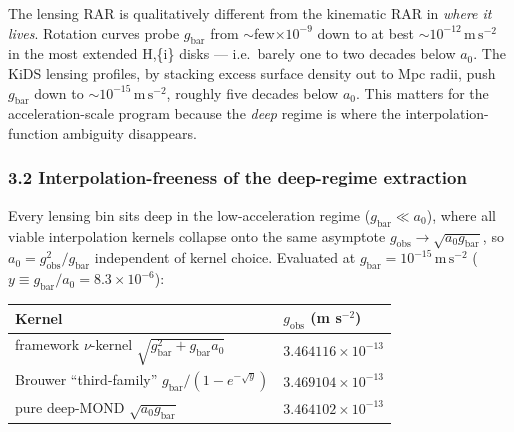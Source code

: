 \documentclass[
]{article}
\newcounter{none} %
\begin{document}
The lensing RAR is qualitatively different from the kinematic RAR in
\emph{where it lives}. Rotation curves probe \(g_\mathrm{bar}\) from
\(\sim\)few\(\times10^{-9}\) down to at best
\(\sim10^{-12}\,\mathrm{m\,s^{-2}}\) in the most extended H,\{\sc i\}
disks --- i.e.~barely one to two decades below \(a_0\). The KiDS lensing
profiles, by stacking excess surface density out to Mpc radii, push
\(g_\mathrm{bar}\) down to \(\sim10^{-15}\,\mathrm{m\,s^{-2}}\), roughly
five decades below \(a_0\). This matters for the acceleration-scale
program because the \emph{deep} regime is where the
interpolation-function ambiguity disappears.

\subsubsection{3.2 Interpolation-freeness of the deep-regime
extraction}\label{interpolation-freeness-of-the-deep-regime-extraction}

Every lensing bin sits deep in the low-acceleration regime
(\(g_\mathrm{bar}\ll a_0\)), where all viable interpolation kernels
collapse onto the same asymptote
\(g_\mathrm{obs}\to\sqrt{a_0 g_\mathrm{bar}}\), so
\(a_0 = g_\mathrm{obs}^2/g_\mathrm{bar}\) independent of kernel choice.
Evaluated at \(g_\mathrm{bar}=10^{-15}\,\mathrm{m\,s^{-2}}\)
(\(y\equiv g_\mathrm{bar}/a_0 = 8.3\times10^{-6}\)):

{\def\LTcaptype{none} %
\begin{longtable}[]{@{}
  >{\raggedright\arraybackslash}p{}
  >{\raggedright\arraybackslash}p{}@{}}
\toprule\noalign{}
\begin{minipage}[b]{\linewidth}\raggedright
Kernel
\end{minipage} & \begin{minipage}[b]{\linewidth}\raggedright
\(g_\mathrm{obs}\) (m s\(^{-2}\))
\end{minipage} \\
\midrule\noalign{}
\endhead
\bottomrule\noalign{}
\endlastfoot
framework \(\nu\)-kernel \(\sqrt{g_\mathrm{bar}^2+g_\mathrm{bar}a_0}\) &
\(3.464116\times10^{-13}\) \\
Brouwer ``third-family'' \(g_\mathrm{bar}/(1-e^{-\sqrt{y}})\) &
\(3.469104\times10^{-13}\) \\
pure deep-MOND \(\sqrt{a_0 g_\mathrm{bar}}\) &
\(3.464102\times10^{-13}\) \\
\end{longtable}
}
\end{document}
